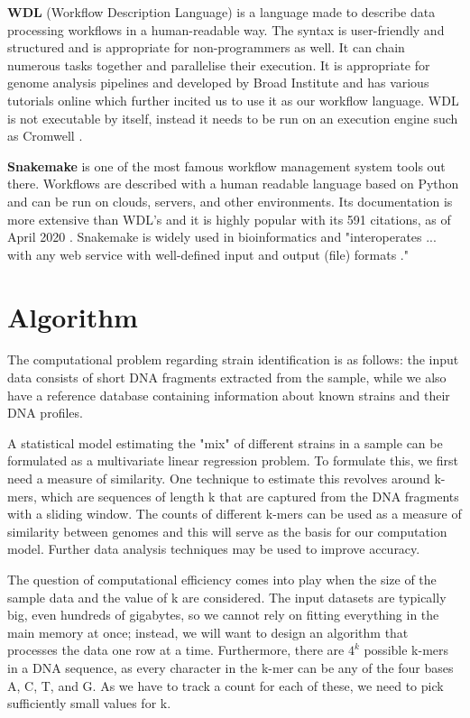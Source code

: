 \documentclass{report}
\begin{document}
\textbf{WDL} (Workflow Description Language) is a language made to describe data processing workflows in a human-readable way. The syntax is user-friendly and structured and is appropriate for non-programmers as well. It can chain numerous tasks together and parallelise their execution. It is appropriate for genome analysis pipelines and developed by Broad Institute and has various tutorials online which further incited us to use it as our workflow language. WDL is not executable by itself, instead it needs to be run on an execution engine such as Cromwell \cite{wdl}.

\textbf{Snakemake} is one of the most famous workflow management system tools out there. Workflows are described with a human readable language based on Python and can be run on clouds, servers, and other environments. Its documentation is more extensive than WDL's and it is highly popular with its 591 citations, as of April 2020 \cite{dimensions}. Snakemake is widely used in bioinformatics and "interoperates ...  with any web service with well-defined input and output  (file) formats \cite{snakemake}."


\section {Algorithm}
The computational problem regarding strain identification is as follows: the input data consists of short DNA fragments extracted from the sample, while we also have a reference database containing information about known strains and their DNA profiles. 

A statistical model estimating the "mix" of different strains in a sample can be formulated as a multivariate linear regression problem. To formulate this, we first need a measure of similarity. One technique to estimate this revolves around k-mers, which are sequences of length k that are captured from the DNA fragments with a sliding window. The counts of different k-mers can be used as a measure of similarity between genomes and this will serve as the basis for our computation model. Further data analysis techniques may be used to improve accuracy.

The question of computational efficiency comes into play when the size of the sample data and the value of k are considered. The input datasets are typically big, even hundreds of gigabytes, so we cannot rely on fitting everything in the main memory at once; instead, we will want to design an algorithm that processes the data one row at a time. Furthermore, there are $4^k$ possible k-mers in a DNA sequence, as every character in the k-mer can be any of the four bases A, C, T, and G. As we have to track a count for each of these, we need to pick sufficiently small values for k.
\end{document}
